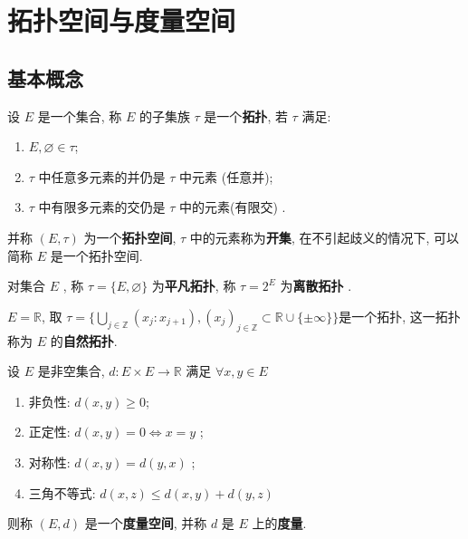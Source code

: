 \documentclass[lang=cn,10pt]{gorgeousnbook}
\numberwithin{equation}{section}%
\numberwithin{figure}{section}%
\begin{document}
\section{拓扑空间与度量空间}
\subsection{基本概念}

\begin{definition}[拓扑空间]\label{def:拓扑空间}
   设 $ E $ 是一个集合, 称 $ E $ 的子集族 $ \tau $ 是一个\textbf{拓扑}, 若 $ \tau $ 满足:
   \begin{enumerate}[($ \mathrm{O}_1 $), itemindent=2.5\parindent]
      \item $ E, \varnothing\in \tau $;
      \item\label{item:O2} $ \tau $ 中任意多元素的并仍是 $ \tau $ 中元素 (任意并);
      \item\label{item:O3} $ \tau $ 中有限多元素的交仍是 $ \tau $ 中的元素(有限交) .
   \end{enumerate}
   并称 $ (E, \tau) $ 为一个\textbf{拓扑空间}, $ \tau $ 中的元素称为\textbf{开集}, 在不引起歧义的情况下, 可以简称 $ E $ 是一个拓扑空间.
\end{definition}

\begin{remark}\label{rmk:平凡离散}
   对集合 $ E $ , 称 $ \tau=\{ E, \varnothing \} $ 为\textbf{平凡拓扑}, 称 $ \tau=2^{E} $ 为\textbf{离散拓扑} .
\end{remark}

\begin{exercise}
   $ E=\mathbb{R} $, 取 $ \tau=\Big\{ \bigcup\limits_{j\in\mathbb{Z}}(x_{j}: x_{j+1}), (x_{j})_{j\in\mathbb{Z}}\subset \mathbb{R}\cup\{ \pm\infty \} \Big\} $是一个拓扑, 这一拓扑称为 $ E $ 的\textbf{自然拓扑}.
\end{exercise}

\begin{definition}[度量空间]\label{def:度量空间}
   设 $ E $ 是非空集合, $ d: E\times E\to \mathbb{R} $ 满足 $ \forall x, y\in E $
   \begin{enumerate}[(1)]
      \item 非负性: $ d(x, y)\geqslant 0 $;
      \item 正定性: $ d(x, y)=0\Longleftrightarrow x=y $ ;
      \item 对称性: $ d(x, y)=d(y, x) $ ;
      \item 三角不等式: $ d(x, z)\leqslant d(x, y)+d(y, z) $
   \end{enumerate}
   则称 $(E,d)$ 是一个\textbf{度量空间}, 并称 $ d $ 是 $ E $ 上的\textbf{度量}.
\end{definition}
\end{document}
